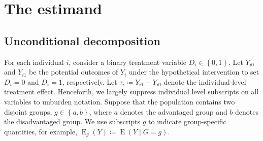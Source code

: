 \documentclass[12pt,a4paper]{article}
\newcommand{\E}{\operatorname{E}}
\begin{document}


\section{The estimand}
\subsection{Unconditional decomposition}
For each individual $i$, consider a binary treatment variable $D_i \in \left\lbrace 0,1 \right\rbrace$. Let $Y_{i0}$ and $Y_{i1}$ be the potential outcomes \citep{rubin_estimating_1974} of $Y_i$ under the hypothetical intervention to set $D_i=0$ and $D_i=1$, respectively. Let $\tau_i \coloneqq Y_{i1} - Y_{i0}$ denote the individual-level treatment effect. Henceforth, we largely suppress individual level subscripts on all variables to unburden notation. Suppose that the population contains two disjoint groups, $g \in \left\lbrace a,b \right\rbrace$, where $a$ denotes the advantaged group and $b$ denotes the disadvantaged group. We use subscripts $g$ to indicate group-specific quantities, for example, $\E_g(Y) \coloneqq \E(Y \mid G=g)$.  
\end{document}
